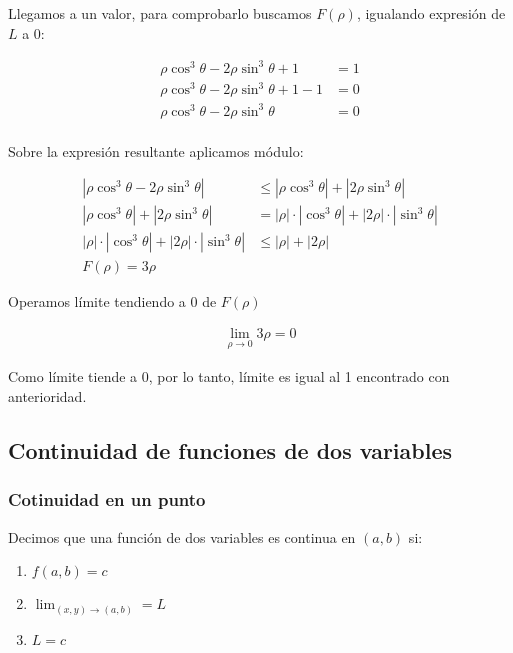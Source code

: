 Llegamos a un valor, para comprobarlo buscamos \(F(\rho)\),
igualando expresión de \(L\) a 0:

\begin{align*}
    \rho\cos^{3}\theta - 2\rho\sin^{3}\theta + 1     & = 1 \\
    \rho\cos^{3}\theta - 2\rho\sin^{3}\theta + 1 - 1 & = 0 \\
    \rho\cos^{3}\theta - 2\rho\sin^{3}\theta         & = 0 \\
\end{align*}

Sobre la expresión resultante aplicamos módulo:

\begin{align*}
    |\rho\cos^{3}\theta - 2\rho\sin^{3}\theta|                 & \leq |\rho\cos^{3}\theta| + |2\rho\sin^{3}\theta|            \\
    |\rho\cos^{3}\theta| + |2\rho\sin^{3}\theta|               & = |\rho|\cdot|\cos^{3}\theta| + |2\rho|\cdot|\sin^{3}\theta| \\
    |\rho|\cdot|\cos^{3}\theta| + |2\rho|\cdot|\sin^{3}\theta| & \leq |\rho| + |2\rho|                                        \\
    \boxed{F(\rho) = 3\rho}
\end{align*}

Operamos límite tendiendo a 0 de \(F(\rho)\)

\begin{align*}
    \lim_{\rho\to0} 3\rho = \boxed{0}
\end{align*}

Como límite tiende a 0, 
por lo tanto, 
límite es igual al 1 encontrado con anterioridad.

\subsection{Continuidad de funciones de dos variables}

\subsubsection{Cotinuidad en un punto}

Decimos que una función de dos variables es continua en \((a,b)\) si:

\begin{enumerate}
    \item \(f(a,b) = c\)
    \item \(\lim_{(x,y) \to (a,b)} = L\)
    \item \(L = c\)
\end{enumerate}

